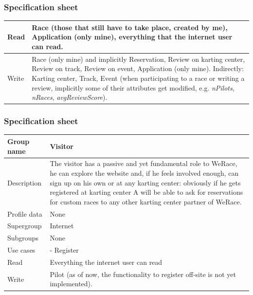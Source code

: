 \documentclass{beamer}
\newcommand{\kc}{WeRace}
\begin{document}
\begin{frame}
    \frametitle{Specification sheet}
\begin{table}
    \tiny
    \begin{tabular}{|p{2cm}|p{6cm}|}
        \hline
        Read & 
        Race (those that still have to take place, created by me),
        Application (only mine), everything that the internet user can read. \\
        \hline
        Write & Race (only mine) and implicitly Reservation, Review on karting center, 
        Review on track, Review on event, Application (only mine). \newline
        Indirectly: Karting center, Track, Event (when participating to a race or writing a review, implicitly some of their 
        attributes get modified, e.g. \textit{nPilots}, \textit{nRaces}, \textit{avgReviewScore}). \\
        \hline
        \end{tabular}
    \end{table}
\end{frame}

\begin{frame}
    \frametitle{Specification sheet}
    \begin{table}
        \tiny
        \begin{tabular}{|p{2cm}|p{6cm}|}
        \hline
        Group name & \textbf{Visitor} \\
        \hline
        Description & The visitor has a passive and yet fundamental role to \kc{}, he can 
        explore the website and, if he feels involved enough, can sign up on his own or at any
        karting center: obviously if he gets registered at karting center A will be able to
        ask for reservations for custom races to any other karting center partner of \kc{}.  \\
        \hline
        Profile data & None \\
        \hline
        Supergroup & Internet \\
        \hline
        Subgroups & None \\
        \hline
        Use cases &
        - Register \\
        \hline
        Read & Everything the internet user can read \\
        \hline
        Write & Pilot (as of now, the functionality to register
        off-site is not yet implemented). \\
        \hline
        \end{tabular}
    \end{table}
\end{frame}
\end{document}
